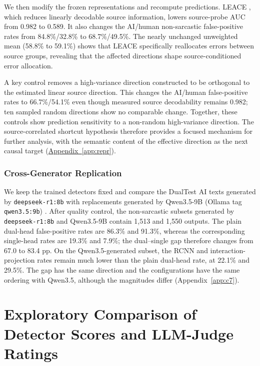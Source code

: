 \documentclass[11pt]{article}
\newcommand{\Appref}[1]{\hyperref[#1]{Appendix~\ref*{#1}}}
\begin{document}
We then modify the frozen representations and recompute predictions. LEACE \citep{belrose2023leace}, which reduces linearly decodable source information, lowers source-probe AUC from 0.982 to 0.589. It also changes the AI/human non-sarcastic false-positive rates from 84.8\%/32.8\% to 68.7\%/49.5\%. The nearly unchanged unweighted mean (58.8\% to 59.1\%) shows that LEACE specifically reallocates errors between source groups, revealing that the affected directions shape source-conditioned error allocation.

A key control removes a high-variance direction constructed to be orthogonal to the estimated linear source direction. This changes the AI/human false-positive rates to 66.7\%/54.1\% even though measured source decodability remains 0.982; ten sampled random directions show no comparable change. Together, these controls show prediction sensitivity to a non-random high-variance direction. The source-correlated shortcut hypothesis therefore provides a focused mechanism for further analysis, with the semantic content of the effective direction as the next causal target (\Appref{app:repr}).

\subsubsection{Cross-Generator Replication}
\label{sec:crossgen}

We keep the trained detectors fixed and compare the DualTest AI texts generated by \texttt{deepseek-r1:8b} with replacements generated by Qwen3.5-9B (Ollama tag \texttt{qwen3.5:9b}) \citep{qwen2026qwen35}. After quality control, the non-sarcastic subsets generated by \texttt{deepseek-r1:8b} and Qwen3.5-9B contain 1{,}513 and 1{,}550 outputs. The plain dual-head false-positive rates are 86.3\% and 91.3\%, whereas the corresponding single-head rates are 19.3\% and 7.9\%; the dual--single gap therefore changes from 67.0 to 83.4 pp. On the Qwen3.5-generated subset, the RCNN and interaction-projection rates remain much lower than the plain dual-head rate, at 22.1\% and 29.5\%. The gap has the same direction and the configurations have the same ordering with Qwen3.5, although the magnitudes differ (\mbox{Appendix~\ref*{app:c7}}).

\section{Exploratory Comparison of Detector Scores and LLM-Judge Ratings}
\label{sec:eval}
\end{document}

